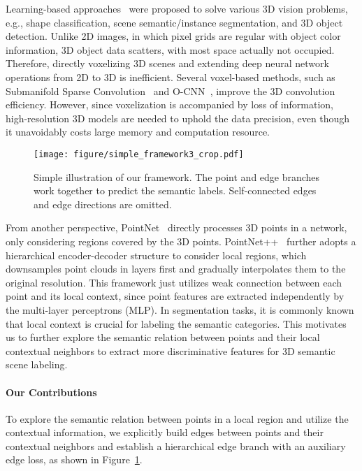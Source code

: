 \documentclass[10pt,twocolumn,letterpaper]{article}
\begin{document}
Learning-based approaches~\cite{3dshapenet, 3DSemanticSegmentationWithSubmanifoldSparseConvNet, pointnet, pointnet2, sgpn, voxelnet, pointrcnn} were proposed to solve various 3D vision problems, e.g., shape classification, scene semantic/instance segmentation, and 3D object detection. Unlike 2D images, in which pixel grids are regular with object color information, 3D object data scatters, with most space actually not occupied.
Therefore, directly voxelizing 3D scenes and extending deep neural network operations from 2D to 3D is inefficient. Several voxel-based methods, such as Submanifold Sparse Convolution~\cite{3DSemanticSegmentationWithSubmanifoldSparseConvNet} and O-CNN~\cite{ocnn}, improve the 3D convolution efficiency. However, since voxelization is accompanied by loss of information, high-resolution 3D models are needed to uphold the data precision, even though it unavoidably costs large memory and computation resource.


\begin{figure}
	\begin{center}
		\texttt{[image: figure/simple\_framework3\_crop.pdf]}
	\end{center}
	\caption{Simple illustration of our framework. The point and edge branches work together to predict the semantic labels. Self-connected edges and edge directions are omitted.}\vspace{-0.05in}
	\label{fig_simple_framework}
	\vspace{-3mm}
\end{figure}

From another perspective, PointNet~\cite{pointnet} directly processes 3D points in a network, only considering regions covered by the 3D points. PointNet++~\cite{pointnet2} further adopts a hierarchical encoder-decoder structure to consider local regions, which downsamples point clouds in layers first and gradually interpolates them to the original resolution.
This framework just utilizes weak connection between each point and its local context, since point features are extracted independently by the multi-layer perceptrons (MLP).
In segmentation tasks, it is commonly known that local context is crucial for labeling the semantic categories. This motivates us to further explore the semantic relation between points and their local contextual neighbors to extract more discriminative features for 3D semantic scene labeling.

\vspace*{-10pt}
\paragraph{Our Contributions}
To explore the semantic relation between points in a local region and utilize the contextual information, we explicitly build edges between points and their contextual neighbors and establish a hierarchical edge branch with an auxiliary edge loss, as shown in Figure~\ref{fig_simple_framework}.
\end{document}
